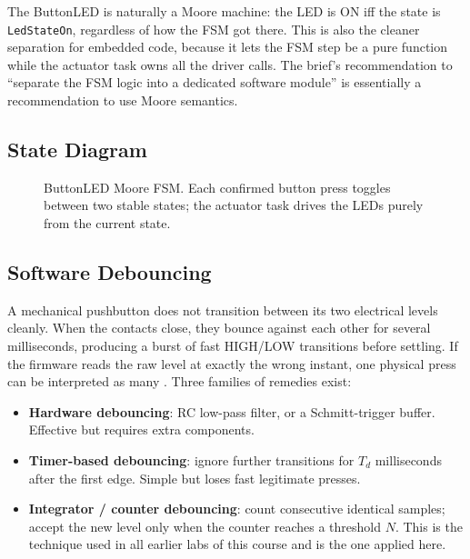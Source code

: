 \documentclass[12pt]{article}
\begin{document}
The ButtonLED is naturally a Moore machine: the LED is ON iff the state is \texttt{LedStateOn}, regardless of how the FSM got there. This is also the cleaner separation for embedded code, because it lets the FSM step be a pure function while the actuator task owns all the driver calls. The brief's recommendation to \enquote{separate the FSM logic into a dedicated software module} \cite{labbrief} is essentially a recommendation to use Moore semantics.

\subsection{State Diagram}

\begin{figure}[H]
\centering
{}
\caption{ButtonLED Moore FSM. Each confirmed button press toggles between two stable states; the actuator task drives the LEDs purely from the current state.}
\label{fig:fsm}
\end{figure}

\subsection{Software Debouncing}

A mechanical pushbutton does not transition between its two electrical levels cleanly. When the contacts close, they bounce against each other for several milliseconds, producing a burst of fast HIGH/LOW transitions before settling. If the firmware reads the raw level at exactly the wrong instant, one physical press can be interpreted as many \cite{debounce}. Three families of remedies exist:
\begin{itemize}
  \item \textbf{Hardware debouncing}: RC low-pass filter, or a Schmitt-trigger buffer. Effective but requires extra components.
  \item \textbf{Timer-based debouncing}: ignore further transitions for $T_d$ milliseconds after the first edge. Simple but loses fast legitimate presses.
  \item \textbf{Integrator / counter debouncing}: count consecutive identical samples; accept the new level only when the counter reaches a threshold $N$. This is the technique used in all earlier labs of this course and is the one applied here.
\end{itemize}
\end{document}
